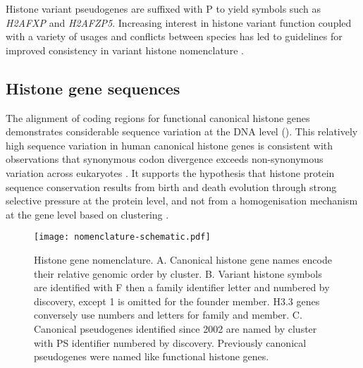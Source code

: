 	Histone variant pseudogenes are suffixed with P to yield symbols such as \textit{H2AFXP} and \textit{H2AFZP5}.
	Increasing interest in histone variant function 
	coupled with a variety of usages and conflicts between species 
	has led to guidelines for improved consistency in variant histone nomenclature .

  \subsection{Histone gene sequences}

	The alignment of coding regions for functional canonical histone genes 
	demonstrates considerable sequence variation at the DNA level (). 
	This relatively high sequence variation in human canonical histone genes 
	is consistent with observations that 
	synonymous codon divergence exceeds non-synonymous variation 
	across eukaryotes  . 
	It supports the hypothesis that histone protein sequence conservation 
	results from birth and death evolution through strong selective pressure at the protein level, 
	and not from a homogenisation mechanism at the gene level based on clustering .

    \begin{figure*}
      \centering
      \texttt{[image: nomenclature-schematic.pdf]}
      \caption{Histone gene nomenclature. 
	  A. Canonical histone gene names encode their relative genomic order by cluster. 
	  B. Variant histone symbols are identified with F then a family identifier letter
	  and numbered by discovery, except 1 is omitted for the founder member.
	  H3.3 genes conversely use numbers and letters for family and member.
	  C. Canonical pseudogenes identified since 2002 are named by cluster with PS identifier numbered by discovery. 
	  Previously canonical pseudogenes were named like functional histone genes.}
      \label{fig:nomenclature}
    \end{figure*}

